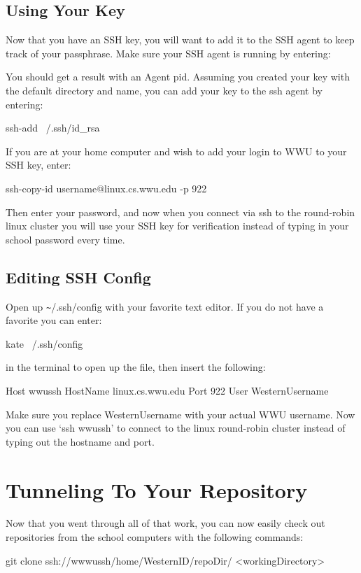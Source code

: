 \documentclass[oneside]{book}
\begin{document}
\newpage
\subsection{Using Your Key}
Now that you have an SSH key, you will want to add it to the SSH agent to keep track of your passphrase. Make sure your SSH agent is running by entering:
    
You should get a result with an Agent pid. Assuming you created your key with the default directory and name, you can add your key to the ssh agent by entering:
    \begin{code}
    ssh-add ~/.ssh/id_rsa
    \end{code}
If you are at your home computer and wish to add your login to WWU to your SSH key, enter:
    \begin{code}
    ssh-copy-id username@linux.cs.wwu.edu -p 922
    \end{code}
Then enter your password, and now when you connect via ssh to the round-robin linux cluster you will use your SSH key for verification instead of typing in your school password every time. 
\subsection{Editing SSH Config}
Open up \texttt{\~}/.ssh/config with your favorite text editor. If you do not have a favorite you can enter: 
    \begin{code} 
    kate ~/.ssh/config 
    \end{code}
in the terminal to open up the file, then insert the following:
    \begin{code}
    Host wwussh
    HostName linux.cs.wwu.edu
    Port 922
    User WesternUsername
    \end{code}
Make sure you replace WesternUsername with your actual WWU username. Now you can use `ssh wwussh' to connect to the linux round-robin cluster instead of typing out the hostname and port. 

\newpage
\section{Tunneling To Your Repository}
Now that you went through all of that work, you can now easily check out repositories from the school computers with the following commands:
    \begin{gitcode}
git clone ssh://wwwussh/home/WesternID/repoDir/ <workingDirectory>
    \end{gitcode}
\end{document}
